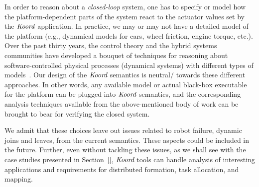 \begin{inparaenum}[(i)]
\item In order to reason about a {\em closed-loop\/} system,  one has to specify or model how the platform-dependent parts of the system react to the actuator values set by the $\emph{Koord}$ application. In practice, we may or may not have a detailed model of the platform (e.g., dynamical models for cars, wheel friction, engine torque, etc.). Over the past thirty years, the control theory and the hybrid systems communities have developed a bouquet of techniques for reasoning about software-controlled physical processes (dynamical systems) with different types of models~\cite{alurbook, platzerbook,seshiabook}. Our design of the  $\emph{Koord}$ semantics is neutral/ towards these different approaches. In other words, any available model or actual black-box executable for the platform can be plugged into $\emph{Koord}$ semantics, and the corresponding analysis techniques available from the above-mentioned body of work can be brought to bear for verifying the closed system.
\end{inparaenum}
We admit that these choices leave out  issues related to robot failure,  dynamic joins and leaves, from the current semantics. These aspects could be included in the future. Further,  even without tackling these issues, as we shall see with the case studies presented in Section~\ref{},  $\emph{Koord}$ tools can handle analysis of interesting applications and requirements for distributed formation, task allocation, and mapping.




